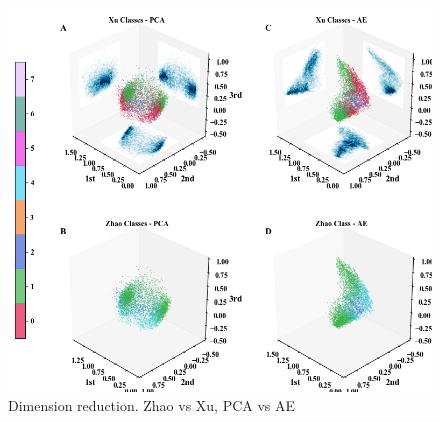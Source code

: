\documentclass[utf8]{frontiersSCNS} %
\begin{document}
\begin{figure}[h!]
	\begin{center}
		\includegraphics[width=16cm]{Roberts/dimreduc}%
	\end{center}
	\caption{ Dimension reduction. Zhao vs Xu, PCA vs AE}\label{fig:dimreduc}
\end{figure}
\end{document}
